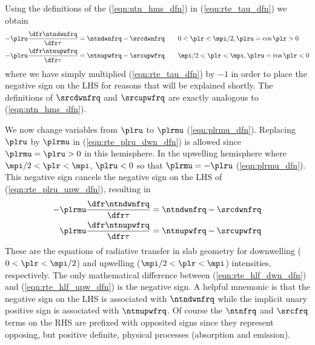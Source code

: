 \documentclass[12pt]{article}
\begin{document}
Using the definitions of the 
(\ref{eqn:ntn_hms_dfn}) in (\ref{eqn:rte_tau_dfn}) we obtain 
\begin{subequations}
\label{eqn:rte_plru_dfn}
\begin{align}
\label{eqn:rte_plru_dwn_dfn}
-\plru \frac{\dfr\ntndwnfrq}{\dfr\tau} & = \ntndwnfrq - \srcdwnfrq 
\qquad 0 < \plr < \mpi/2, \plru = \cos \plr > 0 \\
\label{eqn:rte_plru_upw_dfn}
-\plru \frac{\dfr\ntnupwfrq}{\dfr\tau} & = \ntnupwfrq - \srcupwfrq
\qquad \mpi/2 < \plr < \mpi, \plru = \cos \plr < 0
\end{align}
\end{subequations}
where we have simply multiplied (\ref{eqn:rte_tau_dfn}) by $-1$
in order to place the negative sign on the LHS for reasons that
will be explained shortly.
The definitions of $\srcdwnfrq$ and $\srcupwfrq$ are exactly analogous
to (\ref{eqn:ntn_hms_dfn}).

We now change variables from $\plru$ to $\plrmu$
(\ref{eqn:plrmu_dfn}). 
Replacing $\plru$ by $\plrmu$ in (\ref{eqn:rte_plru_dwn_dfn})
is allowed since $\plrmu = \plru > 0$ in this hemisphere.
In the upwelling hemisphere where $\mpi/2 < \plr < \mpi$, 
$\plru < 0$ so that $\plrmu = -\plru$ (\ref{eqn:plrmu_dfn}).
This negative sign cancels the negative sign on the LHS of 
(\ref{eqn:rte_plru_upw_dfn}), resulting in 
\begin{subequations}
\label{eqn:rte_hlf_dfn}
\begin{align}
\label{eqn:rte_hlf_dwn_dfn}
-\plrmu \frac{\dfr\ntndwnfrq}{\dfr\tau} & = \ntndwnfrq - \srcdwnfrq \\
\label{eqn:rte_hlf_upw_dfn}
\plrmu \frac{\dfr\ntnupwfrq}{\dfr\tau} & = \ntnupwfrq - \srcupwfrq
\end{align}
\end{subequations}
These are the equations of radiative transfer in slab geometry for  
downwelling ($0 < \plr < \mpi/2$) and upwelling 
($\mpi/2 < \plr < \mpi$) intensities, respectively.
The only mathematical difference between (\ref{eqn:rte_hlf_dwn_dfn})
and (\ref{eqn:rte_hlf_upw_dfn}) is the negative sign.
A helpful mnemonic is that the negative sign on the LHS is associated
with $\ntndwnfrq$ while the implicit unary positive sign is associated
with $\ntnupwfrq$.
Of course the $\ntnfrq$ and $\srcfrq$ terms on the RHS are prefixed
with opposited signs since they represent opposing, but positive
definite, physical processes (absorption and emission).
\end{document}
